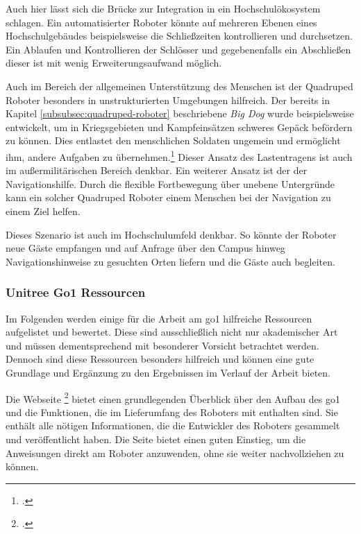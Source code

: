 Auch hier lässt sich die Brücke zur Integration in ein Hochschulökosystem schlagen.
Ein automatisierter Roboter könnte auf mehreren Ebenen eines Hochschulgebäudes beispielsweise die Schließzeiten kontrollieren und durchsetzen.
Ein Ablaufen und Kontrollieren der Schlösser und gegebenenfalls ein Abschließen dieser ist mit wenig Erweiterungsaufwand möglich.

Auch im Bereich der allgemeinen Unterstützung des Menschen ist der Quadruped Roboter besonders in unstrukturierten Umgebungen
hilfreich.
Der bereits in Kapitel \ref{subsubsec:quadruped-roboter} beschriebene \emph{Big Dog} wurde beispielsweise entwickelt, um
in Kriegsgebieten und Kampfeinsätzen schweres Gepäck befördern zu können.
Dies entlastet den menschlichen Soldaten ungemein und ermöglicht ihm, andere Aufgaben zu übernehmen.\footcite{bigdog}
Dieser Ansatz des Lastentragens ist auch im außermilitärischen Bereich denkbar.
Ein weiterer Ansatz ist der der Navigationshilfe.
Durch die flexible Fortbewegung über unebene Untergründe kann ein solcher Quadruped Roboter einem Menschen bei der Navigation
zu einem Ziel helfen.

Dieses Szenario ist auch im Hochschulumfeld denkbar.
So könnte der Roboter neue Gäste empfangen und auf Anfrage über den Campus hinweg Navigationshinweise zu gesuchten Orten liefern und die Gäste auch begleiten.

\subsubsection{Unitree Go1 Ressourcen}
\label{subsubsec:ressourcen}

Im Folgenden werden einige für die Arbeit am \gls{go1} hilfreiche Ressourcen aufgelistet und bewertet.
Diese sind ausschließlich nicht nur akademischer Art und müssen dementsprechend mit besonderer Vorsicht betrachtet werden.
Dennoch sind diese Ressourcen besonders hilfreich und können eine gute Grundlage und Ergänzung zu den Ergebnissen im Verlauf der Arbeit bieten.


Die Webseite \footcite{unitree_tutorials} bietet einen grundlegenden Überblick über den Aufbau
des \gls{go1} und die Funktionen, die im Lieferumfang des Roboters mit enthalten sind.
Sie enthält alle nötigen Informationen, die die Entwickler des Roboters gesammelt und veröffentlicht haben.
Die Seite bietet einen guten Einstieg, um die Anweisungen direkt am Roboter anzuwenden, ohne sie weiter nachvollziehen zu können.


